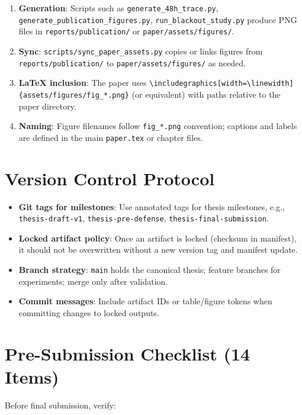 \begin{enumerate}
\item \textbf{Generation}: Scripts such as \texttt{generate\_48h\_trace.py}, \texttt{generate\_publication\_figures.py}, \texttt{run\_blackout\_study.py} produce PNG files in \texttt{reports/publication/} or \texttt{paper/assets/figures/}.
\item \textbf{Sync}: \texttt{scripts/sync\_paper\_assets.py} copies or links figures from \texttt{reports/publication/} to \texttt{paper/assets/figures/} as needed.
\item \textbf{LaTeX inclusion}: The paper uses \texttt{\textbackslash includegraphics[width=\textbackslash linewidth]\{assets/figures/fig\_*.png\}} (or equivalent) with paths relative to the paper directory.
\item \textbf{Naming}: Figure filenames follow \texttt{fig\_*.png} convention; captions and labels are defined in the main \texttt{paper.tex} or chapter files.
\end{enumerate}

\section{Version Control Protocol}
\label{sec:version-control}

\begin{itemize}
\item \textbf{Git tags for milestones}: Use annotated tags for thesis milestones, e.g., \texttt{thesis-draft-v1}, \texttt{thesis-pre-defense}, \texttt{thesis-final-submission}.
\item \textbf{Locked artifact policy}: Once an artifact is locked (checksum in manifest), it should not be overwritten without a new version tag and manifest update.
\item \textbf{Branch strategy}: \texttt{main} holds the canonical thesis; feature branches for experiments; merge only after validation.
\item \textbf{Commit messages}: Include artifact IDs or table/figure tokens when committing changes to locked outputs.
\end{itemize}

\section{Pre-Submission Checklist (14 Items)}
\label{sec:pre-submission-checklist}

Before final submission, verify:

